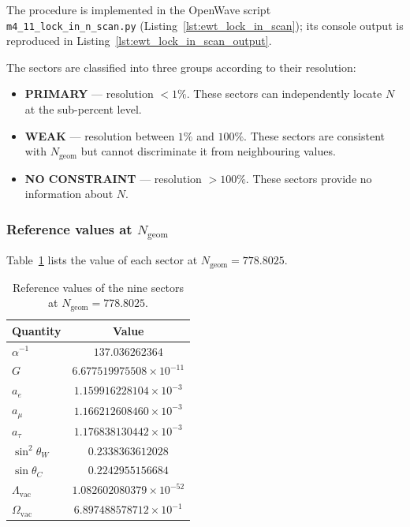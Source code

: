 \documentclass[10pt,a4paper]{article}
\begin{document}
The procedure is implemented in the OpenWave script
\texttt{m4\_11\_lock\_in\_n\_scan.py} (Listing~\ref{lst:ewt_lock_in_scan});
its console output is reproduced in
Listing~\ref{lst:ewt_lock_in_scan_output}. \cite{OpenWaveM411}

The sectors are classified into three groups according to their resolution:
\begin{itemize}
	\item \textbf{PRIMARY} --- resolution $< 1\%$. These sectors can
	independently locate $N$ at the sub-percent level.
	\item \textbf{WEAK} --- resolution between $1\%$ and $100\%$. These
	sectors are consistent with $N_{\text{geom}}$ but cannot
	discriminate it from neighbouring values.
	\item \textbf{NO CONSTRAINT} --- resolution $> 100\%$. These sectors
	provide no information about $N$.
\end{itemize}

\subsubsection{Reference values at $N_{\text{geom}}$}

Table~\ref{tab:lock_in_reference_values} lists the value of each sector at
$N_{\text{geom}} = 778.8025$.

\begin{table}[h!]
	\centering
	\small
	\caption{Reference values of the nine sectors at
		$N_{\text{geom}} = 778.8025$.}
	\label{tab:lock_in_reference_values}
	\begin{tabular}{lc}
		\toprule
		\textbf{Quantity} & \textbf{Value} \\
		\midrule
		$\alpha^{-1}$                & $137.036262364$ \\
		$G$                          & $6.677519975508 \times 10^{-11}$ \\
		$a_e$                        & $1.159916228104 \times 10^{-3}$ \\
		$a_\mu$                      & $1.166212608460 \times 10^{-3}$ \\
		$a_\tau$                     & $1.176838130442 \times 10^{-3}$ \\
		$\sin^2\theta_W$             & $0.2338363612028$ \\
		$\sin\theta_C$               & $0.2242955156684$ \\
		$\Lambda_{\text{vac}}$       & $1.082602080379 \times 10^{-52}$ \\
		$\Omega_{\text{vac}}$        & $6.897488578712 \times 10^{-1}$ \\
		\bottomrule
	\end{tabular}
\end{table}
\end{document}
